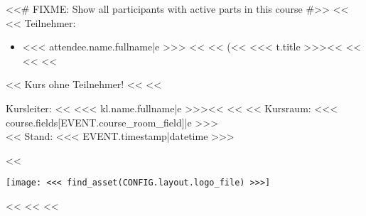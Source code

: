         <<# FIXME: Show all participants with active parts in this course #>>
        <<%
            <<%
                Teilnehmer:
                \begin{itemize}
                    <<%
                        \item <<< attendee.name.fullname|e >>>
                              <<%
                              <<%
                                (<<%
                                    <<< t.title >>><<%
                                 <<%
                              <<%
                    <<%
                \end{itemize}
            <<%
                Kurs ohne Teilnehmer!
            <<%
        <<%

        \vspace{\fill}
        \begin{minipage}[b]{\textwidth-2.5cm}%
            Kursleiter:
            <<%
                <<< kl.name.fullname|e >>><<%
            <<%
            <<%
                Kursraum: <<< course.fields[EVENT.course_room_field]|e >>>\\
            <<%
            Stand: <<< EVENT.timestamp|datetime >>>
        \end{minipage}%
        \hspace{0.5cm}%
        <<%
            \begin{minipage}[b][2cm][b]{2cm}%
                \texttt{[image: <<< find\_asset(CONFIG.layout.logo\_file) >>>]}
            \end{minipage}%
        <<%
        \pagebreak
    <<%
<<%
